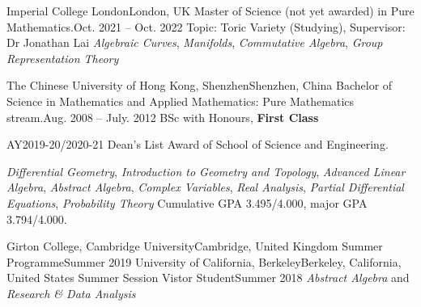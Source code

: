 \resumeSubHeadingListStart
	\resumeSubheading
		{Imperial College London}{London, UK}
		{Master of Science (not yet awarded) in Pure Mathematics.}{Oct. 2021 -- Oct. 2022}
		\resumeItemListStart
				{Topic: Toric Variety (Studying), Supervisor: Dr Jonathan Lai}{}
				{\textit{Algebraic Curves}, \textit{Manifolds}, \textit{Commutative Algebra}, \textit{Group Representation Theory}}
		\resumeItemListEnd

	\resumeSubheading
		{The Chinese University of Hong Kong, Shenzhen}{Shenzhen, China}
		{Bachelor of Science in Mathematics and Applied Mathematics: Pure Mathematics stream.}{Aug. 2008 -- July. 2012}
		\resumeItemListStart
				{BSc with Honours, \textbf{First Class}}
				{AY2019-20/2020-21 Dean's List Award of School of Science and Engineering. \par}
				{\textit{Differential Geometry}, \textit{Introduction to Geometry and Topology}, \textit{Advanced Linear Algebra}, \textit{Abstract Algebra}, \textit{Complex Variables}, \textit{Real Analysis}, \textit{Partial Differential Equations}, \textit{Probability Theory}}
				{Cumulative GPA 3.495/4.000, major GPA 3.794/4.000.}
		\resumeItemListEnd
		
	\resumeSubheading
		{Girton College, Cambridge University}{Cambridge, United Kingdom}
		{Summer Programme}{Summer 2019}
	\resumeSubheading
		{University of California, Berkeley}{Berkeley, California, United States}
		{Summer Session Vistor Student}{Summer 2018}
		\resumeItemListStart
				{\textit{Abstract Algebra} and \textit{Research \& Data Analysis}}
		\resumeItemListEnd
		
\resumeSubHeadingListEnd